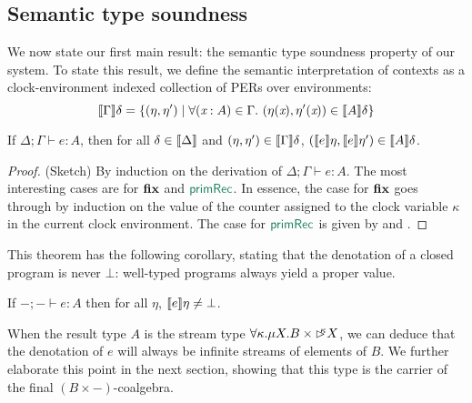 \subsection{Semantic type soundness}
\label{sec:semantic-soundness}

We now state our first main result: the semantic type soundness
property of our system. To state this result, we define the semantic
interpretation of contexts as a clock-environment indexed collection
of PERs over environments:
\begin{displaymath}
  \sem{\Gamma}\delta = \{(\eta, \eta') \mathrel| \forall (\ident{x} : A) \in \Gamma.\ (\eta(\ident{x}), \eta'(\ident{x})) \in \sem{A}\delta \}
\end{displaymath}

\begin{theorem}\label{thm:semantic-soundness}
  If $\Delta; \Gamma \vdash e : A$, then for all $\delta \in
  \llbracket \Delta \rrbracket$ and $(\eta,\eta') \in \llbracket \Gamma \rrbracket\delta$,
  $(\llbracket e \rrbracket\eta,\llbracket e \rrbracket\eta') \in \llbracket A \rrbracket\delta$.
\end{theorem}

\begin{proof}
  (Sketch) By induction on the derivation of $\Delta; \Gamma \vdash e
  : A$. The most interesting cases are for $\textbf{fix}$ and
  $\elim{primRec}$. In essence, the case for $\textbf{fix}$ goes through
  by induction on the value of the counter assigned to the clock
  variable $\kappa$ in the current clock environment. The case for
  $\elim{primRec}$ is given by  and
  .
\end{proof}

This theorem has the following corollary, stating that the denotation
of a closed program is never $\bot$: well-typed programs always yield
a proper value.
\begin{corollary}
  If $-; - \vdash e : A$ then for all $\eta$, $\llbracket e \rrbracket\eta \not=
  \bot$.
\end{corollary}
When the result type $A$ is the stream type $\forall \kappa. \mu X. B
\times \mathord{\rhd\kern-0.4em^{\kappa}} X$, we can deduce that the denotation of $e$ will
always be infinite streams of elements of $B$. We further elaborate
this point in the next section, showing that this type is the carrier
of the final $(B \times -)$-coalgebra.

